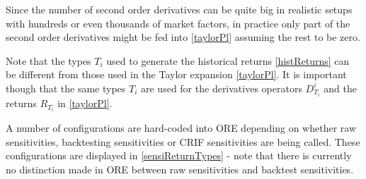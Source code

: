 Since the number of second order derivatives can be quite big in realistic setups with hundreds or even thousands of
market factors, in practice only part of the second order derivatives might be fed into \eqref{taylorPl} assuming the
rest to be zero.

Note that the types $T_i$ used to generate the historical returns \eqref{histReturns} can be different from those used
in the Taylor expansion \eqref{taylorPl}. It is important though that the same types $T_i$ are used for the
derivatives operators $D^i_{T_i}$ and the returns $R_{T_i}$ in \eqref{taylorPl}.

A number of configurations are hard-coded into ORE depending on whether raw sensitivities, backtesting sensitivities or CRIF sensitivities are being called. These configurations are displayed in \ref{sensiReturnTypes} - note that there is currently no distinction made in ORE between raw sensitivities and backtest sensitivities.

